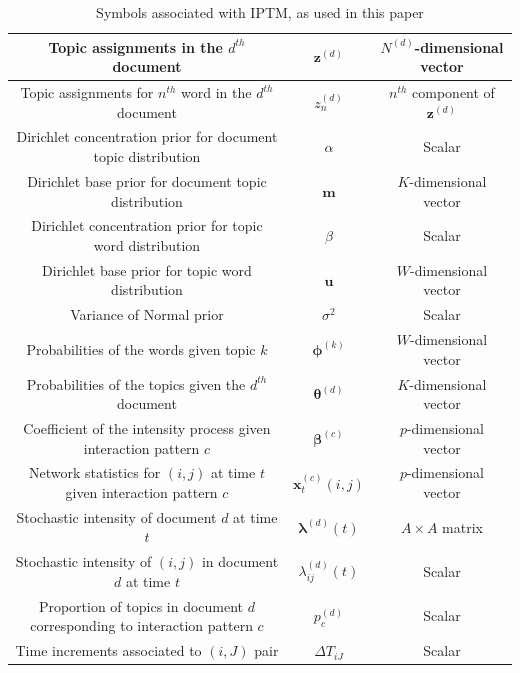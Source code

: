 \documentclass[a4paper]{article}
\begin{document}
\begin{table}[ht]
{\begin{tabular}{ |c|c|c|}
  			\hline 	
  			Topic assignments in the $d^{th}$ document&$\boldsymbol{z}^{(d)}$ & $N^{(d)}$-dimensional vector\\
  			\hline 
  			Topic assignments for $n^{th}$ word in the $d^{th}$ document&${z}_n^{(d)}$ & $n^{th}$ component of $\boldsymbol{z}^{(d)}$\\
  			\hline 	
  			Dirichlet concentration prior for document topic distribution&$\alpha$ & Scalar \\
  			\hline	
  			Dirichlet base prior for document topic distribution&$\boldsymbol{m}$ & $K$-dimensional vector \\
  			\hline			
  			Dirichlet concentration prior for topic word distribution&$\beta$ & Scalar \\
  			\hline			 
  			Dirichlet base prior for topic word distribution&$\boldsymbol{u}$ & $W$-dimensional vector  \\
  			\hline				 	
  			Variance of Normal prior&$\sigma^2$ & Scalar \\
  			\hline		
  			Probabilities of the words given topic $k$ &$\boldsymbol{\phi}^{(k)}$ & $W$-dimensional vector\\
  			\hline
  			Probabilities of the topics given the $d^{th}$ document &$\boldsymbol{\theta}^{(d)}$ & $K$-dimensional vector\\
  			\hline		
  			Coefficient of the intensity process given interaction pattern $c$ &$\boldsymbol{\beta}^{(c)}$ & $p$-dimensional vector\\
  			\hline		
  			Network statistics for $(i, j)$ at time $t$ given interaction pattern $c$ &$\boldsymbol{x}^{(c)}_t{(i,j)}$ & $p$-dimensional vector\\
  			\hline		
  			Stochastic intensity of document $d$ at time $t$ & $\boldsymbol{\lambda}^{(d)}(t)$ & $A\times A$ matrix\\
  			\hline
  		  	Stochastic intensity of $(i, j)$ in document $d$ at time $t$ & ${\lambda}_{ij}^{(d)}(t)$ & Scalar\\
  		  	\hline	
  		  	  		  	Proportion of topics in document $d$ corresponding to interaction pattern $c$ & $p_c^{(d)}$ & Scalar\\
  		  	  		  	\hline
  		  Time increments associated to $(i, J)$ pair & $\Delta T_{iJ}$ & Scalar\\
  		  		\hline
  			\hline
  		\end{tabular}}
  		\caption {Symbols associated with IPTM, as used in this paper}
  		\label{table:SymbolsIPTM}
  	\end{table}
  	\normalsize
\end{document}
